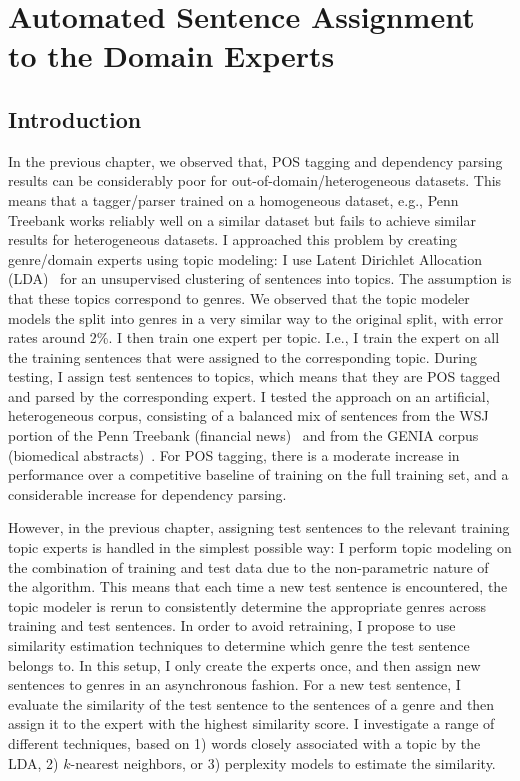 \chapter{Automated Sentence Assignment to the Domain Experts}


\section{Introduction}

In the previous chapter, we observed that, POS tagging and dependency parsing results can be considerably poor for out-of-domain/heterogeneous datasets. This means that a tagger/parser trained on a homogeneous dataset, e.g., Penn Treebank works reliably well on a similar dataset but fails to achieve similar results for heterogeneous datasets. I approached this problem by creating genre/domain experts using topic modeling: I use Latent Dirichlet Allocation (LDA)~\citep{Blei:2003:LDA:944919.944937,Blei:2012:PTM:2133806.2133826} for an unsupervised clustering of  sentences into topics. The assumption is that these topics correspond to genres. We observed that the topic modeler models the split into genres in a very similar way to the original split, with error rates around 2\%. I then train one expert per topic. I.e., I train the expert on all the training sentences that were assigned to the corresponding topic. During testing, I assign test sentences to topics, which means that they are POS tagged and parsed by the corresponding expert.  I tested the approach on an artificial, heterogeneous corpus, consisting of a balanced mix of sentences from the WSJ portion of the Penn Treebank (financial news)~\citep{marcus:kim:ea:94} and from the GENIA corpus (biomedical abstracts)~\citep{tateisi:tsujii:04}. For POS tagging, there is a moderate increase in performance over a competitive baseline of training on the full training set, and a considerable increase for dependency parsing.

However, in the previous chapter,  assigning test sentences to the relevant training topic experts is handled in the simplest possible way: I perform topic modeling on the combination of training and test data due to the non-parametric nature of the algorithm. %
This means that each time a new test sentence is encountered, the topic modeler is rerun to consistently determine the appropriate genres across training and test sentences. In order to avoid retraining, I propose to use similarity estimation techniques to determine which genre the test sentence belongs to. In this setup, I only create the experts once, and then assign new sentences to genres in an asynchronous fashion. 
For a new test sentence, I evaluate the similarity of the test sentence to the sentences of a genre and then assign it to the expert with the highest similarity score. I investigate a range of different techniques, based on 1) words closely associated with a topic by the LDA, 2) $k$-nearest neighbors, or 3) perplexity models to estimate the similarity. 

